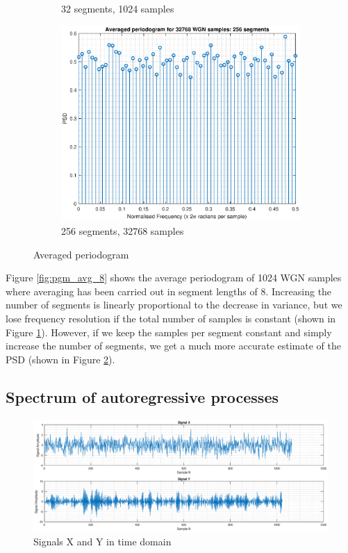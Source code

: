 \documentclass{article}
\begin{document}
\begin{figure}[h!]
\begin{subfigure}{0.32\textwidth}
\caption{32 segments, 1024 samples}
\label{fig:pgm_avg_32}
\end{subfigure}
\begin{subfigure}{0.32\textwidth}
\centering
\includegraphics[width = \textwidth]{pgm_avg_256}
\caption{256 segments, 32768 samples}
\label{fig:pgm_avg_256}
\end{subfigure}
\caption{Averaged periodogram}
\label{fig: pgm_avg}
\end{figure}

Figure \ref{fig:pgm_avg_8} shows the average periodogram of 1024 WGN samples where averaging has been carried out in segment lengths of 8. Increasing the number of segments is linearly proportional to the decrease in variance, but we lose frequency resolution if the total number of samples is constant (shown in Figure \ref{fig:pgm_avg_32}). However, if we keep the samples per segment constant and simply increase the number of segments, we get a much more accurate estimate of the PSD (shown in Figure \ref{fig:pgm_avg_256}).


\subsection{Spectrum of autoregressive processes}

\begin{figure}[h!]
\centering
\includegraphics[width= \textwidth]{signals}
\caption{\label{fig:signals} Signals X and Y in time domain}
\end{figure}
\end{document}
